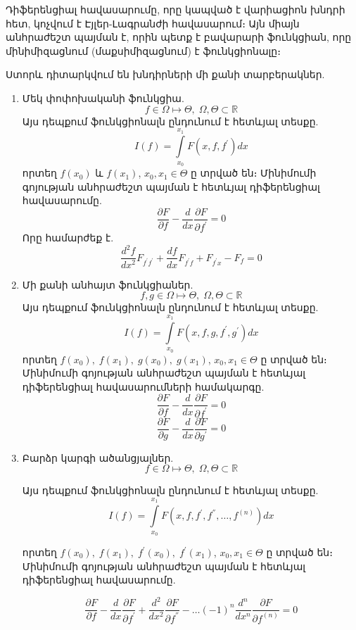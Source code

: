 \documentclass[fleqn, bachelor,subf,12pt,notitlepage]{article}
\begin{document}
Դիֆերենցիալ հավասարումը, որը կապված է վարիացիոն խնդրի հետ, կոչվում է Էյլեր-Լագրանժի հավասարում։ Այն միայն անհրաժեշտ պայման է, որին պետք է բավարարի ֆունկցիան, որը մինիմիզացնում (մաքսիմիզացնում) է ֆունկցիոնալը։

\newpage
\noindent Ստորև դիտարկվում են խնդիրների մի քանի տարբերակներ.

\begin{enumerate}
\item Մեկ փոփոխականի ֆունկցիա.
$$f \in \Omega \mapsto \Theta, \; \Omega, \Theta \subset \mathbb{R}$$
\noindent Այս դեպքում ֆունկցիոնալն ընդունում է հետևյալ տեսքը.
$$I\left(f\right) = \int\limits_{x_0}^{x_{1}} F\left(x, f, f^{'}\right)dx$$
\noindent որտեղ $f(x_{0})$ և $f(x_{1})$, $x_{0}, x_{1} \in \Theta$ ը տրված են։
\noindent Մինիմումի գոյության անհրաժեշտ պայման է հետևյալ դիֆերենցիալ հավասարումը.
$$\dfrac{\partial F}{\partial f} - \dfrac{d}{dx}\dfrac{\partial F}{\partial f^{'}}=0$$
Որը համարժեք է.
$$\dfrac{d^{2}f}{dx^{2}}F_{f^{'}f^{'}}+\dfrac{df}{dx}F_{f^{'}f} + F_{f^{'}x}-F_{f}=0$$
\item Մի քանի անհայտ ֆունկցիաներ.
$$f,g \in \Omega \mapsto \Theta, \; \Omega, \Theta \subset \mathbb{R}$$
\noindent Այս դեպքում ֆունկցիոնալն ընդունում է հետևյալ տեսքը.
$$I\left(f\right) = \int\limits_{x_0}^{x_{1}} F\left(x, f, g, f^{'}, g^{'}\right)dx$$
\noindent որտեղ $f(x_{0}), \; f(x_{1}), \; g(x_{0}), \; g(x_{1})$, $x_{0}, x_{1} \in \Theta$ ը տրված են։
\noindent Մինիմումի գոյության անհրաժեշտ պայման է հետևյալ դիֆերենցիալ հավասարումների համակարգը.
$$\dfrac{\partial F}{\partial f} - \dfrac{d}{dx}\dfrac{\partial F}{\partial f^{'}}=0$$
$$\dfrac{\partial F}{\partial g} - \dfrac{d}{dx}\dfrac{\partial F}{\partial g^{'}}=0$$
\item Բարձր կարգի ածանցյալներ.
$$f \in \Omega \mapsto \Theta, \; \Omega, \Theta \subset \mathbb{R}$$

\noindent Այս դեպքում ֆունկցիոնալն ընդունում է հետևյալ տեսքը.
$$I\left(f\right) = \int\limits_{x_0}^{x_{1}} F\left(x, f, f^{'}, f^{''}, \dots, f^{(n)}\right)dx$$

\noindent որտեղ $f(x_{0}), \; f(x_{1}), \; f^{'}(x_{0}), \; f^{'}(x_{1})$, $x_{0}, x_{1} \in \Theta$ ը տրված են։
\noindent Մինիմումի գոյության անհրաժեշտ պայման է հետևյալ դիֆերենցիալ հավասարումը.

$$\dfrac{\partial F}{\partial f} - \dfrac{d}{dx}\dfrac{\partial F}{\partial f^{'}} + \dfrac{d^{2}}{dx^{2}}\dfrac{\partial F}{\partial f^{''}} - \dots (-1)^{n}\dfrac{d^{n}}{dx^{n}}\dfrac{\partial F}{\partial f^{(n)}}=0$$


\end{enumerate}
\end{document}
